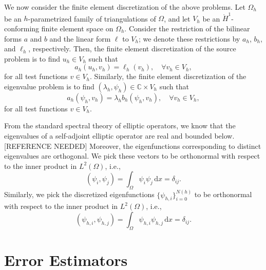 \documentclass[12pt]{amsart}
\begin{document}
We now consider the finite element discretization of the above problems.
Let \(\Omega_h\) be an \(h\)-parametrized family of triangulations of \(\Omega\),
and let \(V_h\) be an \(\mathring{H}^1\)-conforming finite element space on \(\Omega_h\).
Consider the restriction of the bilinear forms \(a\) and \(b\) and the linear form \(\ell\) to \(V_h\);
we denote these restrictions by \(a_h\), \(b_h\), and \(\ell_h\), respectively.
Then, the finite element discretization of the source problem is to find \(u_h \in V_h\) such that
\begin{equation}
    \label{eq:source_fem}
    a_h(u_h, v_h) = \ell_h(v_h), \quad \forall v_h \in V_h,
\end{equation}
for all test functions \(v \in V_h\).
Similarly, the finite element discretization of the eigenvalue problem is to find \((\lambda_h, \psi_h) \in \mathbb{C} \times V_h\) such that
\begin{equation}
    \label{eq:eigenvalue_fem}
    a_h(\psi_h, v_h) = \lambda_h b_h(\psi_h, v_h), \quad \forall v_h \in V_h,
\end{equation}
for all test functions \(v \in V_h\).

From the standard spectral theory of elliptic operators, we know that the eigenvalues of a self-adjoint elliptic operator are real and bounded below. [REFERENCE NEEDED]
Moreover, the eigenfunctions corresponding to distinct eigenvalues are orthogonal.
We pick these vectors to be orthonormal with respect to the inner product in \(L^2(\Omega)\), i.e.,
\begin{equation}
    \label{eq:orthonormality}
    (\psi_i, \psi_j) = \int_{\Omega} \psi_i \psi_j \, \mathrm{d}x = \delta_{ij}.
\end{equation}
Similarly, we pick the discretized eigenfunctions \(\{\psi_{h, i}\}_{i=0}^{N(h)}\) to be orthonormal with respect to the inner product in \(L^2(\Omega)\), i.e.,
\begin{equation}
    \label{eq:orthonormality_fem}
    (\psi_{h, i}, \psi_{h, j}) = \int_{\Omega} \psi_{h, i} \psi_{h, j} \, \mathrm{d}x = \delta_{ij}.
\end{equation}

\section{Error Estimators}
\end{document}

